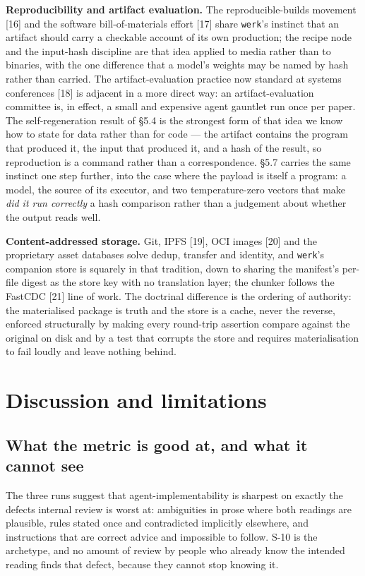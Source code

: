 \documentclass[10pt,twocolumn,letterpaper]{article}
\newcommand{\code}[1]{\texttt{\small #1}}
\begin{document}
\textbf{Reproducibility and artifact evaluation.} The reproducible-builds movement [16] and the software bill-of-materials effort [17] share \code{werk}'s instinct that an artifact should carry a checkable account of its own production; the recipe node and the input-hash discipline are that idea applied to media rather than to binaries, with the one difference that a model's weights may be named by hash rather than carried. The artifact-evaluation practice now standard at systems conferences [18] is adjacent in a more direct way: an artifact-evaluation committee is, in effect, a small and expensive agent gauntlet run once per paper. The self-regeneration result of \S5.4 is the strongest form of that idea we know how to state for data rather than for code --- the artifact contains the program that produced it, the input that produced it, and a hash of the result, so reproduction is a command rather than a correspondence. \S5.7 carries the same instinct one step further, into the case where the payload is itself a program: a model, the source of its executor, and two temperature-zero vectors that make \emph{did it run correctly} a hash comparison rather than a judgement about whether the output reads well.

\textbf{Content-addressed storage.} Git, IPFS [19], OCI images [20] and the proprietary asset databases solve dedup, transfer and identity, and \code{werk}'s companion store is squarely in that tradition, down to sharing the manifest's per-file digest as the store key with no translation layer; the chunker follows the FastCDC [21] line of work. The doctrinal difference is the ordering of authority: the materialised package is truth and the store is a cache, never the reverse, enforced structurally by making every round-trip assertion compare against the original on disk and by a test that corrupts the store and requires materialisation to fail loudly and leave nothing behind.

\section{Discussion and limitations}

\subsection{What the metric is good at, and what it cannot see}

The three runs suggest that agent-implementability is sharpest on exactly the defects internal review is worst at: ambiguities in prose where both readings are plausible, rules stated once and contradicted implicitly elsewhere, and instructions that are correct advice and impossible to follow. S-10 is the archetype, and no amount of review by people who already know the intended reading finds that defect, because they cannot stop knowing it.
\end{document}
